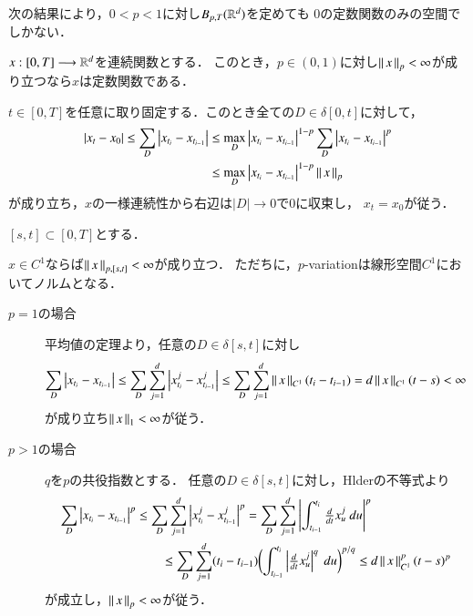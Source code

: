 次の結果により，$0 < p < 1$に対し$B_{p,T}(\mathbb{R}^d)$を定めても
$0$の定数関数のみの空間でしかない．
\begin{screen}
	\begin{thm}
		$x:[0,T] \longrightarrow \mathbb{R}^d$を連続関数とする．
		このとき，$p \in (0, 1)$に対し$\left\|\, x\, \right\|_{p} < \infty$が成り立つなら$x$は定数関数である．
	\end{thm}
\end{screen}

\begin{prf}
	$t \in [0,T]$を任意に取り固定する．このとき全ての$D \in \delta[0,t]$に対して，
	\begin{align}
		|x_t - x_0| \leq \sum_D \left| x_{t_i} - x_{t_{i-1}} \right|
		&\leq \operatorname*{max}_{D} \left| x_{t_i} - x_{t_{i-1}} \right|^{1-p} 
			\sum_D \left| x_{t_i} - x_{t_{i-1}} \right|^p \\
		&\leq \operatorname*{max}_{D} \left| x_{t_i} - x_{t_{i-1}} \right|^{1-p} \left\|\, x\, \right\|_{p}
	\end{align}
	が成り立ち，$x$の一様連続性から右辺は$|D| \longrightarrow 0$で$0$に収束し，
	$x_t = x_0$が従う．
	\QED
\end{prf}

\begin{screen}
	\begin{thm}$[s,t] \subset [0,T]$とする．
		\begin{description}
			$x \in C^1$ならば$\left\|\, x\, \right\|_{p,[s,t]} < \infty$が成り立つ．
			ただちに，$p$-variationは線形空間$C^1$においてノルムとなる．
		\end{description}
	\end{thm}
\end{screen}

\begin{prf}\mbox{}
	\begin{description}
		\item[$p = 1$の場合]
			平均値の定理より，任意の$D \in \delta[s,t]$に対し
			\begin{align}
				\sum_D \left| x_{t_i} - x_{t_{i-1}} \right|
				\leq \sum_D \sum_{j=1}^d \left| x^j_{t_i} - x^j_{t_{i-1}} \right|
				\leq \sum_D \sum_{j=1}^d \left\|\, x\, \right\|_{C^1}(t_i - t_{i-1})
				= d\left\|\, x\, \right\|_{C^1}(t - s) < \infty
			\end{align}
			が成り立ち$\left\|\, x\, \right\|_{1} < \infty$が従う．
		
		\item[$p > 1$の場合] $q$を$p$の共役指数とする．
			任意の$D \in \delta[s,t]$に対し，Hlderの不等式より
			\begin{align}
				\sum_D \left| x_{t_i} - x_{t_{i-1}} \right|^p
				&\leq \sum_D \sum_{j=1}^d \left| x^j_{t_i} - x^j_{t_{i-1}} \right|^p
				= \sum_D \sum_{j=1}^d \left| \int_{t_{i-1}}^{t_i} \tfrac{d}{dt} x^j_{u}\ du \right|^p \\
				&\qquad \leq \sum_D \sum_{j=1}^d (t_i - t_{i-1})
					\biggl( \int_{t_{i-1}}^{t_i} \left| \tfrac{d}{dt} x^j_{u} \right|^q\ du \biggr)^{p/q}
				\leq d\left\|\, x\, \right\|_{C^1}^p(t - s)^p
			\end{align}
			が成立し，$\left\|\, x\, \right\|_{p} < \infty$が従う．
			\QED
	\end{description}
\end{prf}

